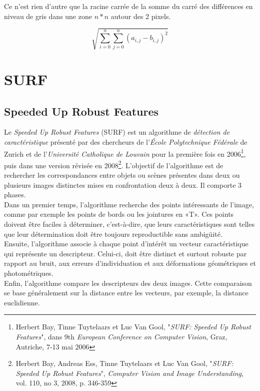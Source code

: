 \documentclass[a4paper,12pt]{report}
\begin{document}
Ce n'est rien d'autre que la racine carrée de la somme du carré des différences en niveau de gris dans une zone $n*n$ autour des 2 pixels.

$$ \sqrt{\sum_{i=0}^{n}\sum_{j=0}^{n}(a_{i,j} - b_{i,j})^2} $$


\pagebreak
\section{SURF}

\subsection{Speeded Up Robust Features}
Le \textit{Speeded Up Robust Features} (SURF) est un algorithme de \textit{détection de caractéristique} présenté par des chercheurs de l'\textit{\'Ecole Polytechnique Fédérale} de Zurich et de l'\textit{Université Catholique de Louvain} pour la première fois en 2006\footnote{Herbert Bay, Tinne Tuytelaars et Luc Van Gool, "\textit{SURF: Speeded Up Robust Features}", dans 9th \textit{European Conference on Computer Vision}, Graz, Autriche, 7-13 mai 2006}, puis dans une version révisée en 2008\footnote{Herbert Bay, Andreas Ess, Tinne Tuytelaars et Luc Van Gool, "\textit{SURF: Speeded Up Robust Features}", \textit{Computer Vision and Image Understanding}, vol. 110, no 3, 2008, p. 346-359}.
L'objectif de l'algorithme est de rechercher les correspondances entre objets ou scènes présentes dans deux ou plusieurs images distinctes mises en confrontation deux à deux. Il comporte 3 phases. 
\\Dans un premier temps, l'algorithme recherche des points intéressants de l'image, comme par exemple les points de bords ou les jointures en «T». Ces points doivent être faciles à déterminer, c'est-à-dire, que leurs caractéristiques sont telles que leur détermination doit être toujours reproductible sans ambigüité. \\ 
Ensuite, l'algorithme associe à chaque point d'intérêt un vecteur caractéristique qui représente un descripteur. Celui-ci, doit être distinct et surtout robuste par rapport au bruit, aux erreurs d'individuation et aux déformations géométriques et photométriques. \\
Enfin,  l'algorithme compare les descripteurs des deux images. Cette comparaison se base généralement sur la distance entre les vecteurs, par exemple, la distance euclidienne.
\end{document}
